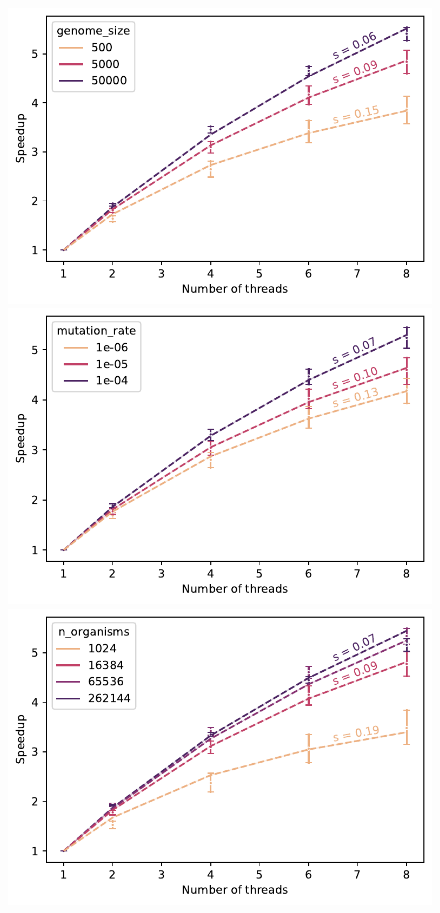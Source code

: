 \documentclass[a4paper, 10pt, twoside]{article}
\begin{document}
\begin{figure}[htb]
	\centering
	\begin{minipage}{0.32\textwidth}
		\centering
		\includegraphics[width=\textwidth]{img/speedup_genome_size.pdf}
	\end{minipage}
	\begin{minipage}{0.32\textwidth}
		\includegraphics[width=\textwidth]{img/speedup_mutation_rate.pdf}
	\end{minipage}
	\begin{minipage}{0.32\textwidth}
		\includegraphics[width=\textwidth]{img/speedup_n_organisms.pdf}

\end{minipage}
\end{figure}
\end{document}
